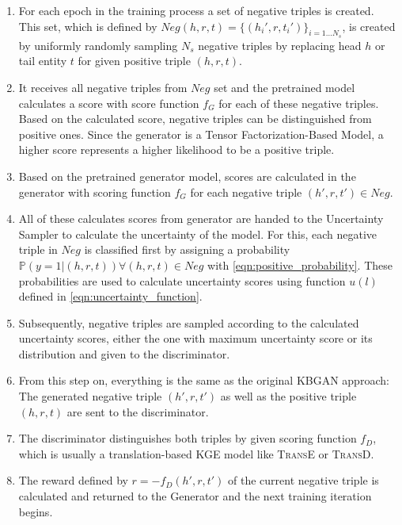 \begin{enumerate}
    \item For each epoch in the training process a set of negative triples is created.
    This set, which is defined by $Neg(h,r,t)=\{(h_i',r,t_i')\}_{i=1\dots N_s}$, is created by uniformly randomly sampling $N_s$ negative triples by replacing head $h$ or tail entity $t$ for given positive triple $(h, r, t)$.
    
    \item 
    It receives all negative triples from $Neg$ set and the pretrained model calculates a score with score function $f_G$ for each of these negative triples.
    Based on the calculated score, negative triples can be distinguished from positive ones. Since the generator is a Tensor Factorization-Based Model, a higher score represents a higher likelihood to be a positive triple.
    
    \item 
    Based on the pretrained generator model, scores are calculated in the generator with scoring function $f_G$ for each negative triple $(h',r,t') \in Neg$.
    
    \item 
    All of these calculates scores from generator are handed to the Uncertainty Sampler to calculate the uncertainty of the model.
    For this, each negative triple in $Neg$ is classified first by assigning a probability $\mathds{P}(y = 1 | (h,r,t)) \forall (h,r,t) \in Neg$ with \autoref{eqn:positive_probability}.
    These probabilities are used to calculate uncertainty scores using function $u(l)$ defined in \autoref{eqn:uncertainty_function}.

    \item Subsequently, negative triples are sampled according to the calculated uncertainty scores, either the one with maximum uncertainty score or its distribution 
    and given to the discriminator.
    
    \item 
    From this step on, everything is the same as the original \ac{KBGAN} approach:
    The generated negative triple $(h',r,t')$ as well as the positive triple $(h, r, t)$ are sent to the discriminator.
    
    \item 
    The discriminator distinguishes both triples by given scoring function $f_D$, which is usually a translation-based \ac{KGE} model like \textsc{TransE} or \textsc{TransD}.
    
    \item 
    The reward defined by $r = - f_D(h',r,t')$ of the current negative triple is calculated and returned to the Generator and the next training iteration begins.
\end{enumerate}

